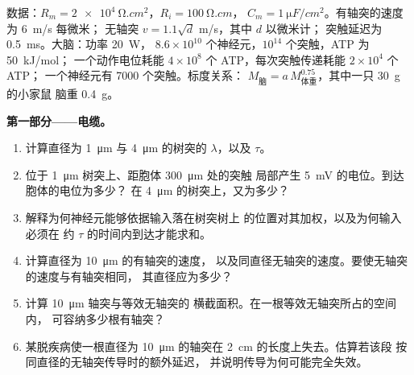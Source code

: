 \begin{problem}
\label{pb:b3:nervous-systems:1}
数据：$R_{m} = \qty{2e4}{\ohm.cm^2}$，$R_{i} = \qty{100}{\ohm.cm}$，
$C_{m} = \qty{1}{\micro F/cm^2}$。有轴突的速度为 \qty{6}{m/s} 每微米；
无轴突 $v = 1.1\sqrt{d}$ m/s，其中 $d$ 以微米计；
突触延迟为 \qty{0.5}{ms}。大脑：功率 \qty{20}{W}，
$8.6\times 10^{10}$ 个神经元，$10^{14}$ 个突触，ATP 为 \qty{50}{kJ/mol}；
一个动作电位耗能 $4\times 10^{8}$ 个 ATP，每次突触传递耗能 $2\times 10^{4}$ 个 ATP；
一个神经元有 \num{7000} 个突触。标度关系：
$M_{\text{脑}} = a\,M_{\text{体重}}^{0.75}$，其中一只 \qty{30}{g} 的小家鼠
脑重 \qty{0.4}{g}。

\medskip
\noindent\textbf{第一部分——电缆。}
\begin{enumerate}
  \item 计算直径为 \qty{1}{\micro m} 与
        \qty{4}{\micro m} 的树突的 $\lambda$，以及 $\tau$。
  \item 位于 \qty{1}{\micro m} 树突上、距胞体 \qty{300}{\micro m} 处的突触
        局部产生 \qty{5}{mV} 的电位。到达胞体的电位为多少？
        在 \qty{4}{\micro m} 的树突上，又为多少？
  \item 解释为何神经元能够依据输入落在树突树上
        的位置对其加权，以及为何输入必须在
        约 $\tau$ 的时间内到达才能求和。
  \item 计算直径为 \qty{10}{\micro m} 的有轴突的速度，
        以及同直径无轴突的速度。要使无轴突的速度与有轴突相同，
        其直径应为多少？
  \item 计算 \qty{10}{\micro m} 轴突与等效无轴突的
        横截面积。在一根等效无轴突所占的空间内，
        可容纳多少根有轴突？
  \item 某脱疾病使一根直径为
        \qty{10}{\micro m} 的轴突在 \qty{2}{cm} 的长度上失去。估算若该段
        按同直径的无轴突传导时的额外延迟，
        并说明传导为何可能完全失效。
\end{enumerate}


\end{problem}
